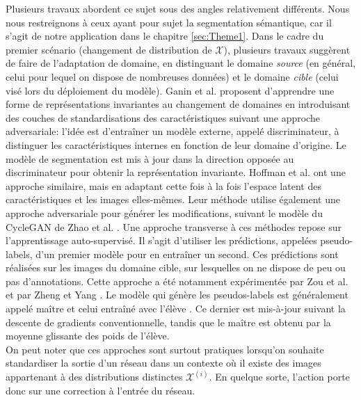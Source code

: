 Plusieurs travaux abordent ce sujet sous des angles relativement différents. Nous nous restreignons à ceux ayant pour sujet la segmentation sémantique, car il s'agit de notre application dans le chapitre \ref{sec:Theme1}. Dans le cadre du premier scénario (changement de distribution  de $\mathcal{X}$), plusieurs travaux suggèrent de faire de l'adaptation de domaine, en distinguant le domaine \textit{source} (en général, celui pour lequel on dispose de nombreuses données) et le domaine \textit{cible} (celui visé lors du déploiement du modèle).
Ganin et al. \cite{ganinDomainAdversarialTrainingNeural2017} proposent d'apprendre une forme de représentations invariantes au changement de domaines en introduisant des couches de standardisations des caractéristiques suivant une approche adversariale: l'idée est d'entraîner un modèle externe, appelé discriminateur, à distinguer les caractéristiques internes en fonction de leur domaine d'origine. Le modèle de segmentation est mis à jour dans la direction opposée au discriminateur pour obtenir la représentation invariante. Hoffman et al. \cite{hoffmanCyCADACycleConsistentAdversarial2018} ont une approche similaire, mais en adaptant cette fois à la fois l'espace latent des caractéristiques et les images elles-mêmes. Leur méthode utilise également une approche adversariale pour générer les modifications, suivant le modèle du CycleGAN de Zhao et al. \cite{zhaoUnpairedImagetoImageTranslation2020}.
Une approche transverse à ces méthodes repose sur l'apprentissage auto-supervisé. Il s'agit d'utiliser les prédictions, appelées pseudo-labels, d'un premier modèle pour en entraîner un second. Ces prédictions sont réalisées sur les images du domaine cible, sur lesquelles on ne dispose de peu ou pas d'annotations. Cette approche a été notamment expérimentée par Zou et al. \cite{zouUnsupervisedDomainAdaptation2018} et par Zheng et Yang \cite{zhengUnsupervisedSceneAdaptation2020}. Le modèle qui génère les pseudos-labels est généralement appelé \og maître \fg et celui entraîné avec \og l'élève \fg. Ce dernier est mis-à-jour suivant la descente de gradients conventionnelle, tandis que le maître est obtenu par la moyenne glissante des poids de l'élève.
\\
On peut noter que ces approches sont surtout pratiques lorsqu'on souhaite standardiser la sortie d'un réseau dans un contexte où il existe des images appartenant à des distributions distinctes $\mathcal{X}^{(i)}$. En quelque sorte, l'action porte donc sur une correction à l'entrée du réseau. \\
